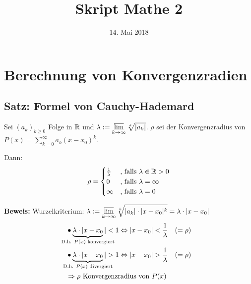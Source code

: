 \documentclass[10pt, a4paper, fleqn]{article}
\begin{document}
    \title{Skript Mathe 2}
    \date{14. Mai 2018}
    \maketitle
\fi
    \section*{Berechnung von Konvergenzradien}
    \subsection{Satz: Formel von Cauchy-Hademard}
    
    Sei $(a_k)_{k \geq 0}$ Folge in $\mathbb{R}$ und $\displaystyle\lambda := \varlimsup_{k \to \infty} \sqrt[k]{|a_k|}$.
    $\rho$ sei der Konvergenzradius von $P(x) = \sum\limits_{k=0}^\infty a_k (x-x_0)^k$.
    
    Dann:
    $$
        \rho = \begin{cases}
            \frac{1}{\lambda} &\text{, falls } \lambda \in \mathbb{R} > 0 \\
            0 &\text{, falls } \lambda = \infty \\
            \infty &\text{, falls } \lambda = 0
        \end{cases}
    $$

    \textbf{Beweis: }
    Wurzelkriterium: $\displaystyle\lambda := \varlimsup_{k \to \infty} \sqrt[k]{|a_k| \cdot |x-x_0|^k} = \lambda \cdot |x-x_0|$
    \[\begin{aligned}
        &\bullet \underbrace{\lambda \cdot |x-x_0}_{\mathclap{\text{D.h. } P(x) \text{ konvergiert}}} | < 1 \eqv |x-x_0| < \frac{1}{\lambda} \quad (= \rho) \\
        &\bullet \underbrace{\lambda \cdot |x-x_0}_{\mathclap{\text{D.h. } P(x) \text{ divergiert}}} | > 1 \eqv |x-x_0| > \frac{1}{\lambda} \quad (= \rho) \\
        &\imp \rho \text{ Konvergenzradius von } P(x)
    \end{aligned}\]
\end{document}
